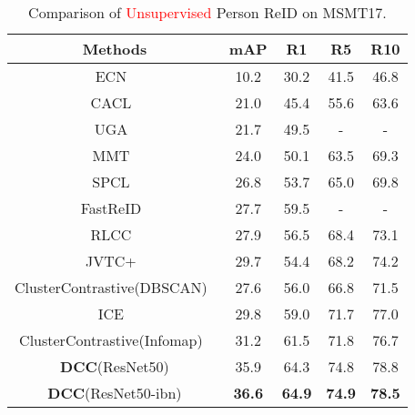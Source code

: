 \documentclass[10pt,twocolumn,letterpaper]{article}
\begin{document}
\begin{table}
\footnotesize
\begin{center}
\begin{tabular}{c|cccc}
\toprule
Methods           & mAP& R1 & R5 & R10\\
\midrule
ECN~\cite{fu2019self} & 10.2& 30.2 & 41.5 & 46.8\\
CACL~\cite{li2021cluster} & 21.0 & 45.4 & 55.6 & 63.6\\
UGA~\cite{wu2019unsupervised} & 21.7 & 49.5 & - & -\\
MMT~\cite{ge2020mutual} & 24.0 & 50.1 & 63.5& 69.3 \\
SPCL~\cite{DBLP:conf/nips/Ge0C0L20} & 26.8 & 53.7 & 65.0 & 69.8 \\
FastReID~\cite{he2020fastreid} & 27.7& 59.5 & - &- \\
RLCC~\cite{DBLP:conf/cvpr/ZhangG0021} & 27.9 & 56.5 & 68.4 & 73.1 \\
JVTC+~\cite{chen2021joint} &29.7&54.4&68.2&74.2\\
ClusterContrastive(DBSCAN)~\cite{dai2021cluster} & 27.6 & 56.0 & 66.8 & 71.5 \\
ICE~\cite{chen2021ice} & 29.8 & 59.0 & 71.7 & 77.0 \\
ClusterContrastive(Infomap)~\cite{dai2021cluster} & 31.2 & 61.5 & 71.8 & 76.7 \\
\textbf{DCC}(ResNet50) &35.9&64.3&74.8&78.8\\
\textbf{DCC}(ResNet50-ibn) &\textbf{36.6}&\textbf{64.9}&\textbf{74.9}&\textbf{78.5}\\
\bottomrule
\end{tabular}
\caption{\small Comparison of \textcolor{red}{Unsupervised} Person ReID on MSMT17.}
\label{tab:unsupervised_msmt}
\end{center}
\end{table}
\end{document}
